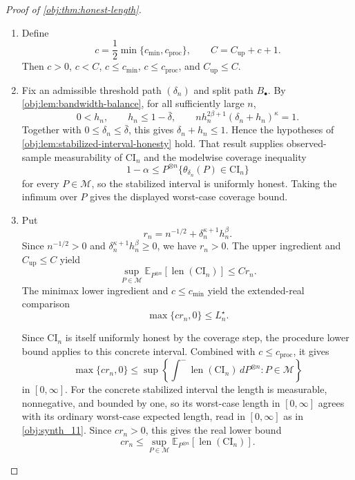 \documentclass[11pt]{article}
\begin{document}
\begin{proof}[Proof of \cref{obj:thm:honest-length}]
\begin{enumerate}
The every-procedure version uses that a uniformly honest procedure is an admissible competitor in the
minimax honest-length criterion. Hence there is a positive constant \(c_{\mathrm{proc}}>0\) such that
every uniformly honest observed-sample interval procedure \(C_n\) satisfies
\[
\max\!\left\{c_{\mathrm{proc}}\left(n^{-1/2}+\delta_n^{\kappa+1}h_n^\beta\right),0\right\}
\le
\sup\left\{
\int^{-}\operatorname{len}(C_n)\,dP^{\otimes n}: P\in\mathcal M
\right\}
\]
in \(\mathbb R_{\ge0}\cup\{\infty\}\).

\item Define
\[
c=\frac12\min\{c_{\mathrm{min}},c_{\mathrm{proc}}\},
\qquad
C=C_{\mathrm{up}}+c+1 .
\]
Then \(c>0\), \(c<C\), \(c\le c_{\mathrm{min}}\), \(c\le c_{\mathrm{proc}}\), and \(C_{\mathrm{up}}\le C\).

\item Fix an admissible threshold path \((\delta_n)\) and split path \(B_\bullet\). By
\cref{obj:lem:bandwidth-balance}, for all sufficiently large \(n\),
\[
0<h_n,
\qquad
h_n\le 1-\bar\delta,
\qquad
n h_n^{2\beta+1}(\delta_n+h_n)^\kappa=1 .
\]
Together with \(0\le\delta_n\le\bar\delta\), this gives \(\delta_n+h_n\le1\). Hence the hypotheses of
\cref{obj:lem:stabilized-interval-honesty} hold. That result supplies observed-sample measurability of
\(\mathrm{CI}_n\) and the modelwise coverage inequality
\[
1-\alpha
\le
P^{\otimes n}\{\theta_{\delta_n}(P)\in \mathrm{CI}_n\}
\]
for every \(P\in\mathcal M\), so the stabilized interval is uniformly honest.
Taking the infimum over \(P\) gives the displayed worst-case coverage bound.

\item Put
\[
r_n=n^{-1/2}+\delta_n^{\kappa+1}h_n^\beta .
\]
Since \(n^{-1/2}>0\) and \(\delta_n^{\kappa+1}h_n^\beta\ge0\), we have \(r_n>0\). The upper ingredient and \(C_{\mathrm{up}}\le C\)
yield
\[
\sup_{P\in\mathcal M}
\mathbb E_{P^{\otimes n}}\!\left[\operatorname{len}(\mathrm{CI}_n)\right]
\le C r_n .
\]
The minimax lower ingredient and \(c\le c_{\mathrm{min}}\) yield the extended-real comparison
\[
\max\{c r_n,0\}\le L_n^\star .
\]

Since \(\mathrm{CI}_n\) is itself uniformly honest by the coverage step, the procedure lower bound
applies to this concrete interval. Combined with \(c\le c_{\mathrm{proc}}\), it gives
\[
\max\{c r_n,0\}
\le
\sup\left\{
\int^{-}\operatorname{len}(\mathrm{CI}_n)\,dP^{\otimes n}: P\in\mathcal M
\right\}
\]
in \([0,\infty]\). For the concrete stabilized interval the length is measurable, nonnegative, and
bounded by one, so its worst-case length in \([0,\infty]\) agrees with its ordinary worst-case
expected length, read in \([0,\infty]\) as in \cref{obj:synth_11}. Since \(c r_n>0\), this gives the
real lower bound
\[
c r_n
\le
\sup_{P\in\mathcal M}
\mathbb E_{P^{\otimes n}}\!\left[\operatorname{len}(\mathrm{CI}_n)\right].
\]


\end{enumerate}
\end{proof}
\end{document}
